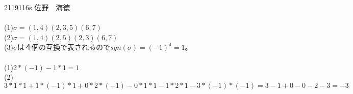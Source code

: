 \documentclass[11pt]{article}
\begin{document}
2119116s 佐野　海徳\\
\\
(1)$\sigma = (1,4)(2,3,5)(6,7)$\\
(2)$\sigma = (1,4)(2,5)(2,3)(6,7)$\\
(3)$\sigma$は４個の互換で表されるので$sgn(\sigma) = (-1)^4 = 1$。\\
\\
(1)$2 * (-1) - 1 * 1 = 1$\\
(2)$3 * 1 * 1 + 1 * (-1) * 1 + 0 * 2 * (-1) - 0 * 1 * 1 - 1 * 2 * 1 - 3 * (-1) * (-1) = 3 - 1 + 0 - 0 - 2 - 3 = -3$\\
\end{document}
